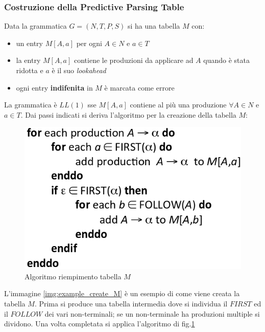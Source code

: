 \subsubsection{Costruzione della Predictive Parsing Table}
Data la grammatica $G=(N,T,P,S)$ si ha una tabella $M$ con:
\begin{itemize}
\item un entry $M[A,a]$ per ogni $A \in N$ e $a \in T$
\item la entry $M[A,a]$ contiene le produzioni da applicare ad $A$ quando \`e
stata ridotta e $a$ \`e il suo \textit{lookahead}
\item ogni entry \textbf{indifenita} in $M$ \`e marcata come errore
\end{itemize}

La grammatica \`e $LL(1)$ sse $M[A,a]$ contiene al pi\`u una produzione $\forall
A \in N$ e $a \in T$. Dai passi indicati si deriva l'algoritmo per la creazione
della tabella $M$:

\begin{figure}[H]
\begin{center}
\includegraphics[scale=0.5]{res/image/algorithm_fill_M}
\end{center}
\caption{Algoritmo riempimento tabella $M$}
\label{img:algorithm_fill_M}
\end{figure}

L'immagine \ref{img:example_create_M} \`e un esempio di come viene creata la
tabella $M$. Prima si produce una tabella intermedia dove si individua il
$FIRST$ ed il $FOLLOW$ dei vari non-terminali; se un non-terminale ha produzioni
multiple si dividono. Una volta completata si applica l'algoritmo di
fig.\ref{img:algorithm_fill_M}

